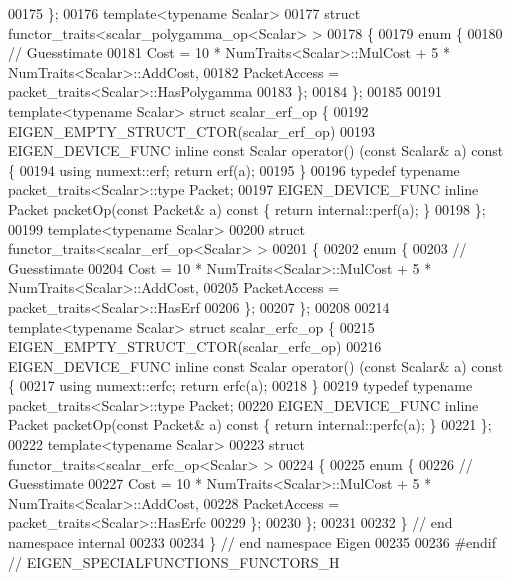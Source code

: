 \begin{DoxyCode}
00175 \};
00176 \textcolor{keyword}{template}<\textcolor{keyword}{typename} Scalar>
00177 \textcolor{keyword}{struct }functor\_traits<scalar\_polygamma\_op<Scalar> >
00178 \{
00179     \textcolor{keyword}{enum} \{
00180         \textcolor{comment}{// Guesstimate}
00181         Cost = 10 * NumTraits<Scalar>::MulCost + 5 * NumTraits<Scalar>::AddCost,
00182         PacketAccess = packet\_traits<Scalar>::HasPolygamma
00183     \};
00184 \};
00185 
00191 \textcolor{keyword}{template}<\textcolor{keyword}{typename} Scalar> \textcolor{keyword}{struct }scalar\_erf\_op \{
00192   EIGEN\_EMPTY\_STRUCT\_CTOR(scalar\_erf\_op)
00193   EIGEN\_DEVICE\_FUNC \textcolor{keyword}{inline} \textcolor{keyword}{const} Scalar operator() (\textcolor{keyword}{const} Scalar& a)\textcolor{keyword}{ const }\{
00194     \textcolor{keyword}{using} numext::erf; \textcolor{keywordflow}{return} erf(a);
00195   \}
00196   \textcolor{keyword}{typedef} \textcolor{keyword}{typename} packet\_traits<Scalar>::type Packet;
00197   EIGEN\_DEVICE\_FUNC \textcolor{keyword}{inline} Packet packetOp(\textcolor{keyword}{const} Packet& a)\textcolor{keyword}{ const }\{ \textcolor{keywordflow}{return} internal::perf(a); \}
00198 \};
00199 \textcolor{keyword}{template}<\textcolor{keyword}{typename} Scalar>
00200 \textcolor{keyword}{struct }functor\_traits<scalar\_erf\_op<Scalar> >
00201 \{
00202   \textcolor{keyword}{enum} \{
00203     \textcolor{comment}{// Guesstimate}
00204     Cost = 10 * NumTraits<Scalar>::MulCost + 5 * NumTraits<Scalar>::AddCost,
00205     PacketAccess = packet\_traits<Scalar>::HasErf
00206   \};
00207 \};
00208 
00214 \textcolor{keyword}{template}<\textcolor{keyword}{typename} Scalar> \textcolor{keyword}{struct }scalar\_erfc\_op \{
00215   EIGEN\_EMPTY\_STRUCT\_CTOR(scalar\_erfc\_op)
00216   EIGEN\_DEVICE\_FUNC \textcolor{keyword}{inline} \textcolor{keyword}{const} Scalar operator() (\textcolor{keyword}{const} Scalar& a)\textcolor{keyword}{ const }\{
00217     \textcolor{keyword}{using} numext::erfc; \textcolor{keywordflow}{return} erfc(a);
00218   \}
00219   \textcolor{keyword}{typedef} \textcolor{keyword}{typename} packet\_traits<Scalar>::type Packet;
00220   EIGEN\_DEVICE\_FUNC \textcolor{keyword}{inline} Packet packetOp(\textcolor{keyword}{const} Packet& a)\textcolor{keyword}{ const }\{ \textcolor{keywordflow}{return} internal::perfc(a); \}
00221 \};
00222 \textcolor{keyword}{template}<\textcolor{keyword}{typename} Scalar>
00223 \textcolor{keyword}{struct }functor\_traits<scalar\_erfc\_op<Scalar> >
00224 \{
00225   \textcolor{keyword}{enum} \{
00226     \textcolor{comment}{// Guesstimate}
00227     Cost = 10 * NumTraits<Scalar>::MulCost + 5 * NumTraits<Scalar>::AddCost,
00228     PacketAccess = packet\_traits<Scalar>::HasErfc
00229   \};
00230 \};
00231 
00232 \} \textcolor{comment}{// end namespace internal}
00233 
00234 \} \textcolor{comment}{// end namespace Eigen}
00235 
00236 \textcolor{preprocessor}{#endif // EIGEN\_SPECIALFUNCTIONS\_FUNCTORS\_H}
\end{DoxyCode}
